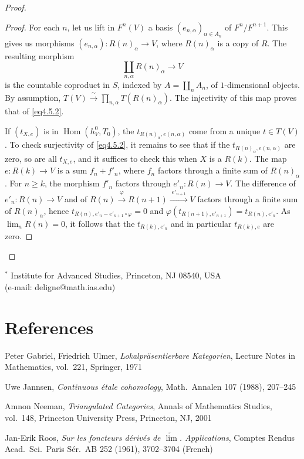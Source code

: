 \documentclass[11pt,a4paper]{article}
\theoremstyle{plain}
\theoremstyle{definition}
\DeclareMathOperator{\Hom}{Hom}
\numberwithin{equation}{section}
\begin{document}
\begin{proof}
\begin{proof}
For each $n$, let us lift in $F^{n}(V)$ a basis $(e_{n,\alpha})_{\alpha\in A_{n}}$ of $F^{n}/F^{n+1}$. This gives us morphisms $(e_{n,\alpha}): R(n)_{\alpha} \to V$, where $R(n)_{\alpha}$ is a copy of $R$. The resulting morphism
\begin{equation*}
\coprod_{n,\alpha} R(n)_{\alpha} \to V
\end{equation*}
is the countable coproduct in $S$, indexed by $A = \coprod_{n} A_{n}$, of $1$-dimensional objects. By assumption, $T(V) \xrightarrow{\;\sim\;} \prod_{n,\alpha} T(R(n)_{\alpha})$. The injectivity of this map proves that of \eqref{eq4.5.2}.

If $(t_{X,e})$ is in $\Hom(h_{V}^{0}, T_{0})$, the $t_{R(n)_{\alpha}, e(n,\alpha)}$ come from a unique $t \in T(V)$. To check surjectivity of \eqref{eq4.5.2}, it remains to see that if the $t_{R(n)_{\alpha}, e(n,\alpha)}$ are zero, so are all $t_{X,e}$, and it suffices to check this when $X$ is a $R(k)$. The map $e: R(k) \to V$ is a sum $f_{n} + f'_{n}$, where $f_{n}$ factors through a finite sum of $R(n)_{\alpha}$. For $n \geq k$, the morphism $f'_{n}$ factors through $e'_{n}: R(n) \to V$. The difference of $e'_{n}: R(n) \to V$ and of $R(n) \xrightarrow{\;\varphi\;} R(n+1) \xrightarrow{\;e'_{n+1}\;} V$ factors through a finite sum of $R(n)_{\alpha}$, hence $t_{R(n), e'_{n} - e'_{n+1} \circ \varphi} = 0$ and $\varphi(t_{R(n+1), e'_{n+1}}) = t_{R(n), e'_{n}}$. As $\lim_{n} R(n) = 0$, it follows that the $t_{R(k), e'_{n}}$ and in particular $t_{R(k), e}$ are zero.
\end{proof}
\end{proof}

\vspace{1em}
\noindent $^{*}$ Institute for Advanced Studies, Princeton, NJ 08540, USA\\
(e-mail: deligne@math.ias.edu)


\section*{References}

\begin{enumerate}[label={[\arabic*]}]
\item Peter Gabriel, Friedrich Ulmer, \textit{Lokalpr\"{a}sentierbare Kategorien}, Lecture Notes in Mathematics, vol.~221, Springer, 1971

\item Uwe Jannsen, \textit{Continuous \'{e}tale cohomology}, Math.~Annalen 107 (1988), 207--245

\item Amnon Neeman, \textit{Triangulated Categories}, Annals of Mathematics Studies, vol.~148, Princeton University Press, Princeton, NJ, 2001

\item Jan-Erik Roos, \textit{Sur les foncteurs d\'{e}riv\'{e}s de $\underleftarrow{\lim}$. Applications}, Comptes Rendus Acad.\ Sci.\ Paris S\'{e}r.~AB 252 (1961), 3702--3704 (French)
\end{enumerate}
\end{document}
